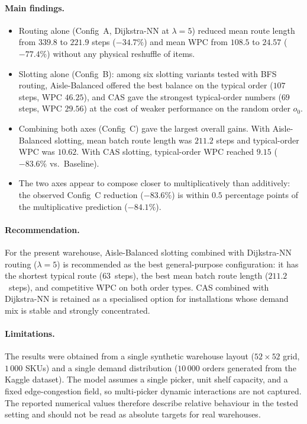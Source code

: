 \documentclass[12pt,a4paper]{article}
\begin{document}
\paragraph{Main findings.}
\begin{itemize}
  \item Routing alone (Config~A, Dijkstra-NN at $\lambda = 5$) reduced
        mean route length from $339.8$ to $221.9$ steps ($-34.7\%$) and
        mean WPC from $108.5$ to $24.57$ ($-77.4\%$) without any
        physical reshuffle of items.
  \item Slotting alone (Config~B): among six slotting variants tested
        with BFS routing, Aisle-Balanced offered the best balance on
        the typical order ($107$ steps, WPC $46.25$), and CAS gave the
        strongest typical-order numbers ($69$ steps, WPC $29.56$) at
        the cost of weaker performance on the random order $o_0$.
  \item Combining both axes (Config~C) gave the largest overall gains.
        With Aisle-Balanced slotting, mean batch route length was
        $211.2$ steps and typical-order WPC was $10.62$.
        With CAS slotting, typical-order WPC reached $9.15$
        ($-83.6\%$ vs.\ Baseline).
  \item The two axes appear to compose closer to multiplicatively than
        additively: the observed Config~C reduction ($-83.6\%$) is
        within $0.5$ percentage points of the multiplicative prediction
        ($-84.1\%$).
\end{itemize}

\paragraph{Recommendation.}
For the present warehouse, Aisle-Balanced slotting combined with
Dijkstra-NN routing ($\lambda = 5$) is recommended as the best
general-purpose configuration: it has the shortest typical route
($63$~steps), the best mean batch route length ($211.2$~steps), and
competitive WPC on both order types. CAS combined with Dijkstra-NN is
retained as a specialised option for installations whose demand mix
is stable and strongly concentrated.

\paragraph{Limitations.}
The results were obtained from a single synthetic warehouse layout
($52 \times 52$ grid, $1\,000$ SKUs) and a single demand distribution
($10\,000$ orders generated from the Kaggle dataset).
The model assumes a single picker, unit shelf capacity, and a fixed
edge-congestion field, so multi-picker dynamic interactions are not
captured. The reported numerical values therefore describe relative
behaviour in the tested setting and should not be read as absolute
targets for real warehouses.
\end{document}
